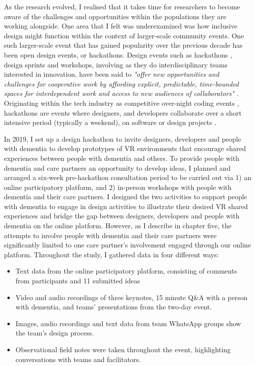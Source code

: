 As the research evolved, I realised that it takes time for researchers to become aware of the challenges and opportunities within the populations they are working alongside. One area that I felt was underexamined was how inclusive design might function within the context of larger-scale community events. One such larger-scale event that has gained popularity over the previous decade has been open design events, or hackathons. Design events such as hackathons \citep{olesen_what_2021}, design sprints and workshops, involving as they do interdisciplinary teams interested in innovation, have been said to \textit{"offer new opportunities and challenges for cooperative work by affording explicit, predictable, time-bounded spaces for interdependent work and access to new audiences of collaborators"} \citep{filippova_hacking_2017}. Originating within the tech industry as competitive over-night coding events \citep{jones_theres_2015}, hackathons are events where designers, and developers collaborate over a short intensive period (typically a weekend), on software or design projects \citep{nandi_hackathons_2016}. 

In 2019, I set up a design hackathon to invite designers, developers and people with dementia to develop prototypes of VR environments that encourage shared experiences between people with dementia and others. To provide people with dementia and care partners an opportunity to develop ideas, I planned and arranged a six-week pre-hackathon consultation period to be carried out via 1) an online participatory platform, and 2) in-person workshops with people with dementia and their care partners. I designed the two activities to support people with dementia to engage in design activities to illustrate their desired VR shared experiences and bridge the gap between designers, developers and people with dementia on the online platform. However, as I describe in chapter five, the attempts to involve people with dementia and their care partners were significantly limited to one care partner's involvement engaged through our online platform. Throughout the study, I gathered data in four different ways:
\begin{itemize}
    \item Text data from the online participatory platform, consisting of comments from participants and 11 submitted ideas
    \item Video and audio recordings of three keynotes, 15 minute Q\&A with a person with dementia, and teams' presentations from the two-day event.
    \item Images, audio recordings and text data from team WhatsApp groups show the team's design process.
    \item Observational field notes were taken throughout the event, highlighting conversations with teams and facilitators.
\end{itemize}

